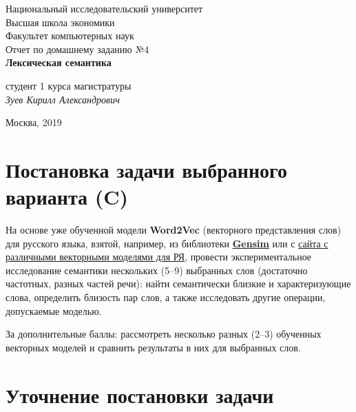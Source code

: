 \documentclass[oneside,final,12pt]{article}
\begin{document}
\begin{titlepage}
\begin{center}

    Национальный исследовательский университет\\
    Высшая школа экономики\\
    Факультет компьютерных наук\\[60mm]
    \bigskip
    Отчет по домашнему заданию №4 \\[5mm]   
    \textsf{\large\bfseries
         Лексическая семантика
    }\\[50mm]

   
    \begin{flushright}
        \parbox{0.4\textwidth}{
            студент 1 курса магистратуры\\
            \emph{Зуев Кирилл Александрович}\\[5mm]
        }
    \end{flushright}

    \vspace{\fill}
    Москва, 2019
\end{center}
\end{titlepage}

\newpage

\renewcommand{\contentsname}{Содержание}
\tableofcontents

\newpage

\section{Постановка задачи выбранного варианта (C)}

На основе уже обученной модели \textbf{Word2Vec} (векторного представления слов) для русского языка, взятой, например, из библиотеки \href{https://radimrehurek.com/gensim/models/word2vec.html}{\textbf{Gensim}}  или с \href{http://rusvectores.org/ru/models/}{сайта с различными векторными моделями для РЯ}, провести экспериментальное исследование семантики нескольких (5--9) выбранных слов (достаточно частотных, разных частей речи): найти семантически близкие и характеризующие слова, определить близость пар слов, а также исследовать другие операции, допускаемые моделью.

За дополнительные баллы: рассмотреть несколько разных (2--3) обученных векторных моделей и сравнить результаты в них для выбранных слов.

\section{Уточнение постановки задачи}
\end{document}
